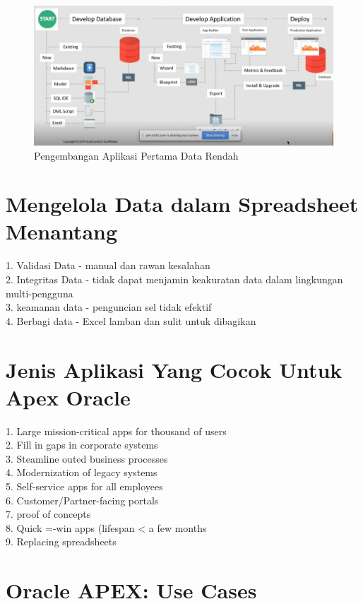 \documentclass[12pt, times new roman, a4paper]{article}
\begin{document}
\begin{figure}[h]
	\centering
		\includegraphics[scale=0.5]{Gambar/1}
	\caption{Pengembangan Aplikasi Pertama Data Rendah}
\end{figure}

\section{Mengelola Data dalam Spreadsheet Menantang}

1. Validasi Data - manual dan rawan kesalahan\\
2. Integritas Data - tidak dapat menjamin keakuratan data dalam 	 lingkungan multi-pengguna\\
3. keamanan data - penguncian sel tidak efektif\\
4. Berbagi data - Excel lamban dan sulit untuk dibagikan\\

\section{Jenis Aplikasi Yang Cocok Untuk Apex Oracle}

1. Large mission-critical apps for thousand of users\\
2. Fill in gaps in corporate systems\\
3. Steamline outed business processes\\
4. Modernization of legacy systems\\
5. Self-service apps for all employees\\
6. Customer/Partner-facing portals\\
7. proof of concepts\\
8. Quick =-win apps (lifespan < a few months\\
9. Replacing spreadsheets\\

\section{Oracle APEX: Use Cases}
\end{document}
